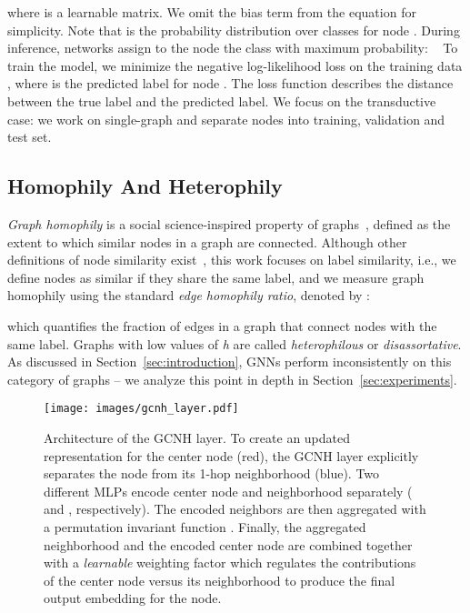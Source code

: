 \documentclass[conference]{IEEEtran}
\begin{document}
where  is a learnable matrix. We omit the bias term from the equation for simplicity.
Note that  is the probability distribution over classes for node .
During inference, networks assign to the node the class with maximum probability:
~
To train the model, we minimize the negative log-likelihood loss on the training data
,  where  is the predicted label for node .
The loss function  describes the distance between the true label  and the predicted label. We focus on the transductive case: we work on single-graph and separate nodes into training, validation and test set.

\subsection{Homophily And Heterophily}
\textit{Graph homophily} is a social science-inspired property of graphs~\cite{mcpherson_birds_2001}, defined as the extent to which similar nodes in a graph are connected. Although other definitions of node similarity exist~\cite{yang_diverse_2021, ma_is_2022, cavallo_2ncs_2022}, this work focuses on label similarity, i.e., we define nodes as similar if they share the same label, and we measure graph homophily using the standard \textit{edge homophily ratio}, denoted by :

which quantifies the fraction of edges in a graph that connect nodes with the same label.
Graphs with low values of \textit{h} are called \textit{heterophilous} or \textit{disassortative}. As discussed in Section~\ref{sec:introduction}, GNNs perform inconsistently on this category of graphs -- we analyze this point in depth in Section~\ref{sec:experiments}.



\begin{figure*}[t]
\centering
\texttt{[image: images/gcnh\_layer.pdf]}
\caption{Architecture of the GCNH layer. To create an updated representation for the center node (red), the GCNH layer explicitly separates the node from its 1-hop neighborhood (blue). Two different MLPs encode center node and neighborhood separately ( and ,  respectively). The encoded neighbors are then aggregated with a permutation invariant function . Finally, the aggregated neighborhood and the encoded center node are combined together with a \textit{learnable} weighting factor  which regulates the contributions of the center node versus its neighborhood to produce the final output embedding for the node.}
\label{fig:gcnh_architecture2}
\end{figure*}
\end{document}
